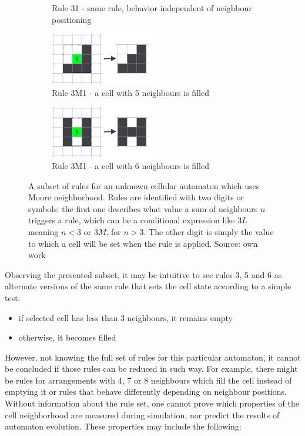 \documentclass[12pt]{report}
\begin{document}
\begin{figure}[H]
\begin{subfigure}[t]{0.4\textwidth}
		\caption{Rule 31 - same rule, behavior independent of neighbour positioning} 
	\end{subfigure} \hspace{1em} 
	\hfill
	\begin{subfigure}[t]{0.4\textwidth}
		\centering
		\includegraphics[width=0.5\textwidth]{images/rule5alive}
		\caption{Rule 3M1 - a cell with 5 neighbours is filled} 
	\end{subfigure} \hspace{1em} 
	\hfill
	\begin{subfigure}[t]{0.4\textwidth}
		\centering
		\includegraphics[width=0.5\textwidth]{images/rule6alive}
		\caption{Rule 3M1 - a cell with 6 neighbours is filled} 
	\end{subfigure} \hspace{1em} 
	\hfill
	\caption{A subset of rules for an unknown cellular automaton which uses Moore neighborhood. Rules are identified with two digits or symbols: the first one describes what value a sum of neighbours $n$ triggers a rule, which can be a conditional expression like $3L$ meaning $n < 3$ or $3M$, for $n > 3$. The other digit is simply the value to which a cell will be set when the rule is applied. Source: own work}
	\label{fig:examplecarules}
\end{figure}

Observing the presented subset, it may be intuitive to see rules 3, 5 and 6 as alternate versions of the same rule that sets the cell state according to a simple test: 
\begin{itemize}
	\item if selected cell has less than 3 neighbours, it remains empty
	\item otherwise, it becomes filled
\end{itemize} 
However, not knowing the full set of rules for this particular automaton, it cannot be concluded if those rules can be reduced in such way. For example, there might be rules for arrangements with 4, 7 or 8 neighbours which fill the cell instead of emptying it or rules that behave differently depending on neighbour positions. Without information about the rule set, one cannot prove which properties of the cell neighborhood are measured during simulation, nor predict the results of automaton evolution. These properties may include the following:
\end{document}
